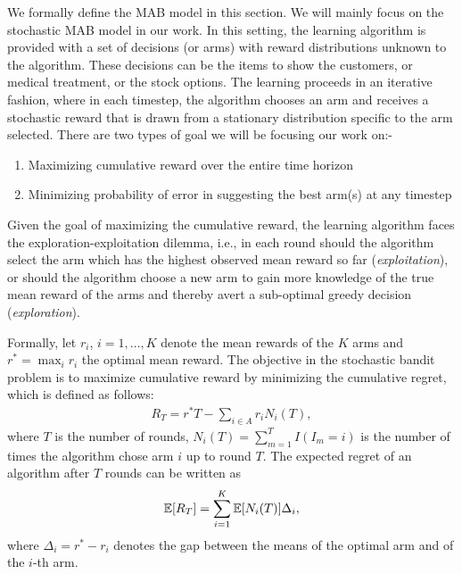We formally define the MAB model in this section. We will mainly focus on the stochastic MAB model in our work. In this setting, the learning algorithm is provided with a set of decisions (or arms) with reward distributions unknown to the algorithm. These decisions can be the items to show the customers, or medical treatment, or the stock options. The learning proceeds in an iterative fashion, where in each timestep, the algorithm chooses an arm and receives a stochastic reward that is drawn from a stationary distribution specific to the arm selected.  There are two types of goal we will be focusing our work on:-

\begin{enumerate}
\item Maximizing cumulative reward over the entire time horizon
\item Minimizing probability of error in suggesting the best arm(s) at any timestep
\end{enumerate}

Given the goal of maximizing the cumulative reward, the learning algorithm faces the exploration-exploitation dilemma, i.e., in each round should the algorithm select the arm which has the highest observed mean reward so far 
(\textit{exploitation}), or should the algorithm choose a new arm to gain more knowledge of the true mean reward of the arms and thereby avert a sub-optimal greedy decision (\textit{exploration}). 

Formally, let $r_i$, $i=1,\ldots,K$ denote the mean rewards of the $K$ arms and $r^* = \max_i r_i$ the optimal mean reward. The objective in the stochastic bandit problem is to maximize cumulative reward by  minimizing the cumulative regret, which is defined as follows:
\begin{align*}
R_{T}=r^{*}T - \sum_{i\in A} r_{i}N_{i}(T),
\end{align*}
where $T$ is the number of rounds, $N_{i}(T)=\sum_{m=1}^T I(I_m=i)$ is the number of times the algorithm chose arm $i$ up to round $T$.
The expected regret of an algorithm after $T$ rounds can be written as
\begin{align*}
\mathbb{E}[R_{T}]= \sum_{i=1}^K \mathbb{E}[N_i(T)] \Delta_i,
\end{align*}
where $\Delta_{i}=r^{*}-r_{i}$ denotes the gap between the means of the optimal arm and of the $i$-th arm. 


